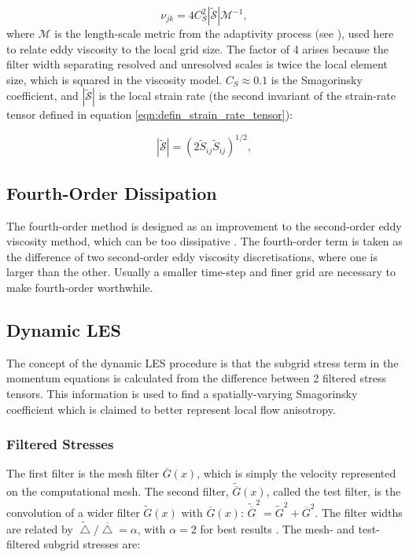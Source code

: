 \begin{equation}
\nu_{jk} = 4C_S^2 \left | \mathcal{\tilde S} \right | \mathcal{M}^{-1},
\end{equation}
where $\mathcal{M}$ is the length-scale metric from the adaptivity process (see \citet{pain2001}),
used here to relate eddy viscosity to the local grid size. The factor of 4 arises because the filter
width separating resolved and unresolved scales is twice the local element size, which is squared in
the viscosity model. $C_S \approx 0.1$ is the Smagorinsky coefficient, and
$\left | \mathcal{\tilde S} \right |$ is the local strain rate (the second invariant of the strain-rate
tensor defined in equation \eqref{eqn:defin_strain_rate_tensor}):

\begin{equation}
\left | \mathcal{\tilde S} \right | = (2 \tilde S_{ij} \tilde S_{ij})^{1/2},
\end{equation}

\subsection{Fourth-Order Dissipation}
\label{sec:fourth_order_diss_LES}

The fourth-order method is designed as an improvement to the second-order eddy viscosity method, which can be too dissipative \citep{adam}. The fourth-order term is taken as the difference of two second-order eddy viscosity discretisations, where one is larger than the other. Usually a smaller time-step and finer grid are necessary to make fourth-order worthwhile.

\subsection{Dynamic LES}\label{dynamic}

The concept of the dynamic LES procedure is that the subgrid stress term in the momentum equations is calculated from the difference between 2 filtered stress tensors. This information is used to find a spatially-varying Smagorinsky coefficient which is claimed to better represent local flow anisotropy.

\subsubsection{Filtered Stresses}

The first filter is the mesh filter $\overline G(x)$, which is simply the velocity represented on the computational mesh. The second filter, $\widetilde{\overline G}(x)$, called the test filter, is the convolution of a wider filter $\widetilde G(x)$ with $\overline G(x)$: $\widetilde{\overline G}^2 = \widetilde G^2 + \overline G^2$. The filter widths are related by $\widetilde \bigtriangleup/\overline \bigtriangleup = \alpha$, with $\alpha=2$ for best results \citep{germano1991}. The mesh- and test-filtered subgrid stresses are:

